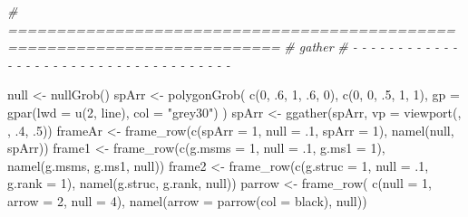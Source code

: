 \documentclass[
]{article}
\newenvironment{Shaded}{\begin{snugshade}}{\end{snugshade}}
\newcommand{\AttributeTok}[1]{\textcolor[rgb]{0.77,0.63,0.00}{#1}}
\newcommand{\CommentTok}[1]{\textcolor[rgb]{0.56,0.35,0.01}{\textit{#1}}}
\newcommand{\DecValTok}[1]{\textcolor[rgb]{0.00,0.00,0.81}{#1}}
\newcommand{\FunctionTok}[1]{\textcolor[rgb]{0.00,0.00,0.00}{#1}}
\newcommand{\NormalTok}[1]{#1}
\newcommand{\OtherTok}[1]{\textcolor[rgb]{0.56,0.35,0.01}{#1}}
\newcommand{\StringTok}[1]{\textcolor[rgb]{0.31,0.60,0.02}{#1}}
\begin{document}
\begin{Shaded}
\begin{Highlighting}[]
\CommentTok{\# ==========================================================================}
\CommentTok{\# gather}
\CommentTok{\# {-} {-} {-} {-} {-} {-} {-} {-} {-} {-} {-} {-} {-} {-} {-} {-} {-} {-} {-} {-} {-} {-} {-} {-} {-} {-} {-} {-} {-} {-} {-} {-} {-} {-} {-} {-} {-}}

\NormalTok{null }\OtherTok{\textless{}{-}} \FunctionTok{nullGrob}\NormalTok{()}
\NormalTok{spArr }\OtherTok{\textless{}{-}} \FunctionTok{polygonGrob}\NormalTok{(}
  \FunctionTok{c}\NormalTok{(}\DecValTok{0}\NormalTok{, .}\DecValTok{6}\NormalTok{, }\DecValTok{1}\NormalTok{, .}\DecValTok{6}\NormalTok{, }\DecValTok{0}\NormalTok{), }\FunctionTok{c}\NormalTok{(}\DecValTok{0}\NormalTok{, }\DecValTok{0}\NormalTok{, .}\DecValTok{5}\NormalTok{, }\DecValTok{1}\NormalTok{, }\DecValTok{1}\NormalTok{),}
  \AttributeTok{gp =} \FunctionTok{gpar}\NormalTok{(}\AttributeTok{lwd =} \FunctionTok{u}\NormalTok{(}\DecValTok{2}\NormalTok{, line), }\AttributeTok{col =} \StringTok{"grey30"}\NormalTok{)}
\NormalTok{)}
\NormalTok{spArr }\OtherTok{\textless{}{-}} \FunctionTok{ggather}\NormalTok{(spArr, }\AttributeTok{vp =} \FunctionTok{viewport}\NormalTok{(, , .}\DecValTok{4}\NormalTok{, .}\DecValTok{5}\NormalTok{))}
\NormalTok{frameAr }\OtherTok{\textless{}{-}} \FunctionTok{frame\_row}\NormalTok{(}\FunctionTok{c}\NormalTok{(}\AttributeTok{spArr =} \DecValTok{1}\NormalTok{, }\AttributeTok{null =}\NormalTok{ .}\DecValTok{1}\NormalTok{, }\AttributeTok{spArr =} \DecValTok{1}\NormalTok{),}
  \FunctionTok{namel}\NormalTok{(null, spArr))}
\NormalTok{frame1 }\OtherTok{\textless{}{-}} \FunctionTok{frame\_row}\NormalTok{(}\FunctionTok{c}\NormalTok{(}\AttributeTok{g.msms =} \DecValTok{1}\NormalTok{, }\AttributeTok{null =}\NormalTok{ .}\DecValTok{1}\NormalTok{, }\AttributeTok{g.ms1 =} \DecValTok{1}\NormalTok{),}
  \FunctionTok{namel}\NormalTok{(g.msms, g.ms1, null))}
\NormalTok{frame2 }\OtherTok{\textless{}{-}} \FunctionTok{frame\_row}\NormalTok{(}\FunctionTok{c}\NormalTok{(}\AttributeTok{g.struc =} \DecValTok{1}\NormalTok{, }\AttributeTok{null =}\NormalTok{ .}\DecValTok{1}\NormalTok{, }\AttributeTok{g.rank =} \DecValTok{1}\NormalTok{),}
  \FunctionTok{namel}\NormalTok{(g.struc, g.rank, null))}
\NormalTok{parrow }\OtherTok{\textless{}{-}} \FunctionTok{frame\_row}\NormalTok{(}
  \FunctionTok{c}\NormalTok{(}\AttributeTok{null =} \DecValTok{1}\NormalTok{, }\AttributeTok{arrow =} \DecValTok{2}\NormalTok{, }\AttributeTok{null =} \DecValTok{4}\NormalTok{),}
  \FunctionTok{namel}\NormalTok{(}\AttributeTok{arrow =} \FunctionTok{parrow}\NormalTok{(}\AttributeTok{col =} \StringTok{\textquotesingle{}black\textquotesingle{}}\NormalTok{), null))}

\end{Highlighting}
\end{Shaded}
\end{document}
